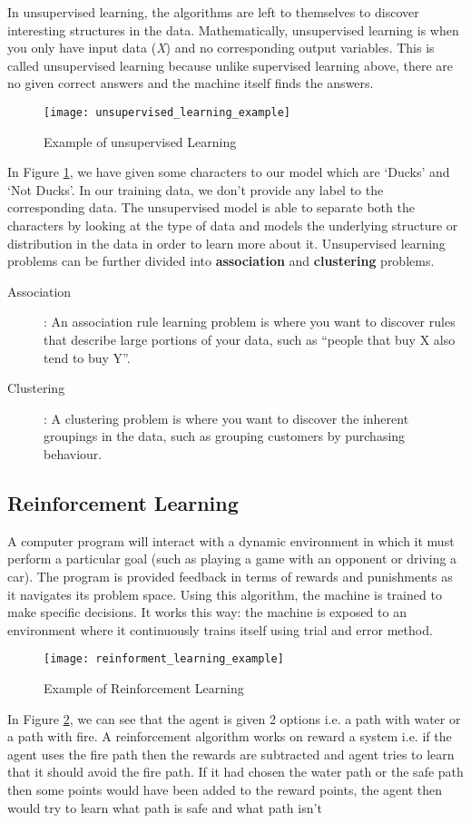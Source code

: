 \documentclass{report}
\begin{document}
In unsupervised learning, the algorithms are left to themselves to discover interesting structures in the data. Mathematically, unsupervised
learning is when you only have input data (\textit{X}) and no corresponding output variables. This is called unsupervised learning because
unlike supervised learning above, there are no given correct answers and the machine itself finds the answers.
\begin{figure}[h]
  \centering
  \texttt{[image: unsupervised\_learning\_example]}
  \caption{Example of unsupervised Learning}
  \label{fig:unsupervised_learning_example}
\end{figure}
In Figure \ref{fig:unsupervised_learning_example}, we have given some characters to our model which are ‘Ducks’ and ‘Not Ducks’. In our
training data, we don’t provide any label to the corresponding data. The unsupervised model is able to separate both the characters by
looking at the type of data and models the underlying structure or distribution in the data in order to learn more about it. Unsupervised
learning problems can be further divided into \textbf{association} and \textbf{clustering} problems.

\begin{description}
\item[ Association] : An association rule learning problem is where you want to discover rules that describe large portions of your data, such as “people that buy X also tend to buy Y”.
\item[ Clustering] : A clustering problem is where you want to discover the inherent groupings in the data, such as grouping customers by purchasing behaviour.
\end{description}

\subsection{Reinforcement Learning}
A computer program will interact with a dynamic environment in which it must perform a particular goal (such as playing a game with an
opponent or driving a car). The program is provided feedback in terms of rewards and punishments as it navigates its problem space. 
Using this algorithm, the machine is trained to make specific decisions. It works this way: the machine is exposed to an environment
where it continuously trains itself using trial and error method.
\begin{figure}[h]
  \centering
  \texttt{[image: reinforment\_learning\_example]}
  \caption{Example of Reinforcement Learning}
  \label{fig:reinforment_learning_example}
\end{figure}
In Figure \ref{fig:reinforment_learning_example}, we can see that the agent is given 2 options i.e. a path with water or a path with fire. A reinforcement algorithm
works on reward a system i.e. if the agent uses the fire path then the rewards are subtracted and agent tries to learn that it should avoid
the fire path. If it had chosen the water path or the safe path then some points would have been added to the reward points, the agent then
would try to learn what path is safe and what path isn’t
\end{document}
